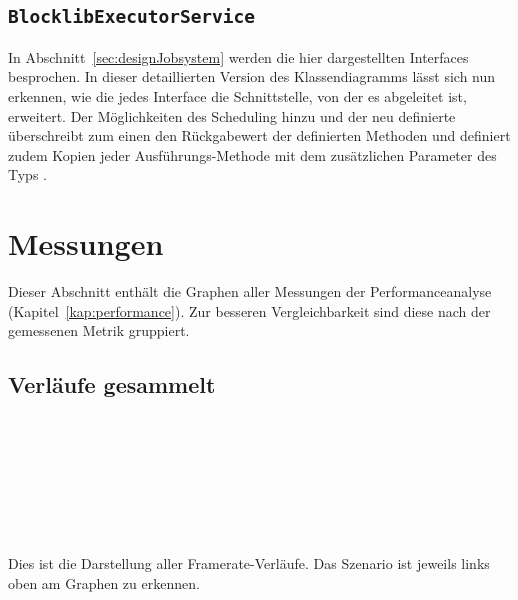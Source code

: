 \clearpage
\subsection{\texttt{BlocklibExecutorService}}\label{appendix:BlocklibExecutorService}
{
	\centering
	
	\par
}
In Abschnitt~\vref{sec:designJobsystem} werden die hier dargestellten Interfaces besprochen. In dieser detaillierten Version des Klassendiagramms lässt sich nun erkennen, wie die jedes Interface die Schnittstelle, von der es abgeleitet ist, erweitert. Der  Möglichkeiten des Scheduling hinzu und der neu definierte  überschreibt zum einen den Rückgabewert der definierten Methoden und definiert zudem Kopien jeder Ausführungs-Methode mit dem zusätzlichen Parameter  des Typs .

\clearpage
\section{Messungen}\label{appendix:plots}
\small
Dieser Abschnitt enthält die Graphen aller Messungen der Performanceanalyse (Kapitel~\ref{kap:performance}). Zur besseren Vergleichbarkeit sind diese nach der gemessenen Metrik gruppiert.
\vspace*{-.3em}\subsection{ Verläufe gesammelt}\label{appendix:fpsplots}
\settowidth{}
\\[-.3em]
\\[-.3em]
\\[-.3em]
\\[-.3em]
\\[-.3em]
\\[-.3em]\\[-.3em]
Dies ist die Darstellung aller Framerate-Verläufe. Das Szenario ist jeweils links oben am Graphen zu erkennen.

